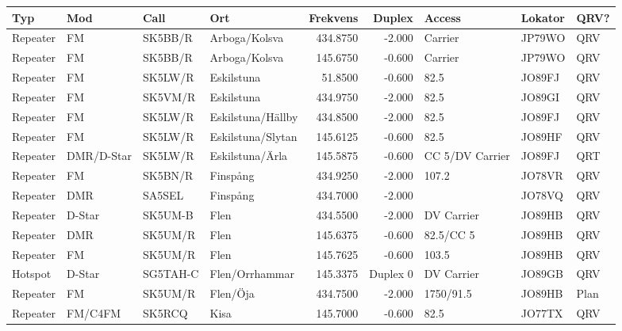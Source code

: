 \begin{longtable}{llllrrlll}
\bf Typ  & \bf Mod    & \bf Call & \bf Ort           & \bf Frekvens & \bf Duplex & \bf Access      & \bf Lokator & \bf QRV? \\ \hline
Repeater & FM         & SK5BB/R  & Arboga/Kolsva     & 434.8750     & -2.000     & Carrier         & JP79WO      & QRV      \\
Repeater & FM         & SK5BB/R  & Arboga/Kolsva     & 145.6750     & -0.600     & Carrier         & JP79WO      & QRV      \\
Repeater & FM         & SK5LW/R  & Eskilstuna        & 51.8500      & -0.600     & 82.5            & JO89FJ      & QRV      \\
Repeater & FM         & SK5VM/R  & Eskilstuna        & 434.9750     & -2.000     & 82.5            & JO89GI      & QRV      \\
Repeater & FM         & SK5LW/R  & Eskilstuna/Hällby & 434.8500     & -2.000     & 82.5            & JO89FJ      & QRV      \\
Repeater & FM         & SK5LW/R  & Eskilstuna/Slytan & 145.6125     & -0.600     & 82.5            & JO89HF      & QRV      \\
Repeater & DMR/D-Star & SK5LW/R  & Eskilstuna/Ärla   & 145.5875     & -0.600     & CC 5/DV Carrier & JO89FJ      & QRT      \\
Repeater & FM         & SK5BN/R  & Finspång          & 434.9250     & -2.000     & 107.2           & JO78VR      & QRV      \\
Repeater & DMR        & SA5SEL   & Finspång          & 434.7000     & -2.000     &                 & JO78VQ      & QRV      \\
Repeater & D-Star     & SK5UM-B  & Flen              & 434.5500     & -2.000     & DV Carrier      & JO89HB      & QRV      \\
Repeater & DMR        & SK5UM/R  & Flen              & 145.6375     & -0.600     & 82.5/CC 5       & JO89HB      & QRV      \\
Repeater & FM         & SK5UM/R  & Flen              & 145.7625     & -0.600     & 103.5           & JO89HB      & QRV      \\
Hotspot  & D-Star     & SG5TAH-C & Flen/Orrhammar    & 145.3375     & Duplex 0   & DV Carrier      & JO89GB      & QRV      \\
Repeater & FM         & SK5UM/R  & Flen/Öja          & 434.7500     & -2.000     & 1750/91.5       & JO89HB      & Plan     \\
Repeater & FM/C4FM    & SK5RCQ   & Kisa              & 145.7000     & -0.600     & 82.5            & JO77TX      & QRV      \\

\end{longtable}
